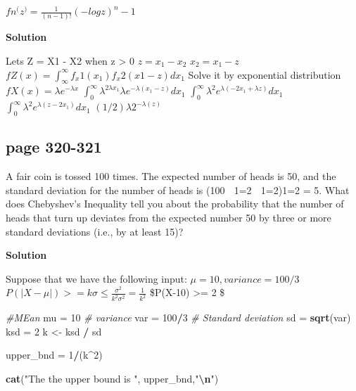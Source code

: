 \documentclass[
]{article}
\newenvironment{Shaded}{\begin{snugshade}}{\end{snugshade}}
\newcommand{\CommentTok}[1]{\textcolor[rgb]{0.56,0.35,0.01}{\textit{#1}}}
\newcommand{\DecValTok}[1]{\textcolor[rgb]{0.00,0.00,0.81}{#1}}
\newcommand{\FunctionTok}[1]{\textcolor[rgb]{0.13,0.29,0.53}{\textbf{#1}}}
\newcommand{\NormalTok}[1]{#1}
\newcommand{\OtherTok}[1]{\textcolor[rgb]{0.56,0.35,0.01}{#1}}
\newcommand{\SpecialCharTok}[1]{\textcolor[rgb]{0.81,0.36,0.00}{\textbf{#1}}}
\newcommand{\StringTok}[1]{\textcolor[rgb]{0.31,0.60,0.02}{#1}}
\begin{document}
\(fn^(z^) = \frac {1}{(n-1)!}(-log z)^n-1\)

\textbf{Solution}

Lets Z = X1 - X2 when z \textgreater{} 0 \(z = x_1 - x_2\)
\(x_2 = x_1 - z\)
\(fZ(x) = \int_{\infty}^\infty f_x1(x_1) f_x2(x1 - z)dx_1\) Solve it by
exponential distribution \(fX(x) = \lambda e ^{-\lambda x}\)
\(\int_{0}^\infty \lambda ^{2\lambda x_1} \lambda e ^{-\lambda (x_1 - z)} dx_1\)
\(\int_{0}^\infty \lambda ^2e^{\lambda( -2x_1 + \lambda z)} dx_1\)
\(\int_{0}^\infty \lambda ^2e^{\lambda (z-2x_1)}dx_1\)
\((1/2)\lambda 2^{-\lambda(z)}\)

\hypertarget{page-320-321}{%
\subsection{page 320-321}\label{page-320-321}}

A fair coin is tossed 100 times. The expected number of heads is 50, and
the standard deviation for the number of heads is (100  1=2  1=2)1=2 =
5. What does Chebyshev's Inequality tell you about the probability that
the number of heads that turn up deviates from the expected number 50 by
three or more standard deviations (i.e., by at least 15)?

\textbf{Solution}

Suppose that we have the following input:
\(\mu = 10 , variance = 100/3\)
\(P(|X-\mu|) >= k\sigma \le \frac {\sigma^2}{k^2\sigma^2} = \frac {1}{k^2}\)
\$P(\textbar X-10\textbar) \textgreater= 2 \le {} \$

\begin{Shaded}
\begin{Highlighting}[]
\CommentTok{\#MEan }
\NormalTok{mu }\OtherTok{=} \DecValTok{10} 
\CommentTok{\# variance}
\NormalTok{var }\OtherTok{=} \DecValTok{100}\SpecialCharTok{/}\DecValTok{3}
\CommentTok{\# Standard deviation }
\NormalTok{sd }\OtherTok{=} \FunctionTok{sqrt}\NormalTok{(var)}
\NormalTok{ksd }\OtherTok{=} \DecValTok{2} 
\NormalTok{k }\OtherTok{\textless{}{-}}\NormalTok{ ksd }\SpecialCharTok{/}\NormalTok{ sd}

\NormalTok{upper\_bnd }\OtherTok{=} \DecValTok{1}\SpecialCharTok{/}\NormalTok{(k}\SpecialCharTok{\^{}}\DecValTok{2}\NormalTok{)}


\FunctionTok{cat}\NormalTok{(}\StringTok{"The the upper bound is "}\NormalTok{, upper\_bnd,}\StringTok{"}\SpecialCharTok{\textbackslash{}n}\StringTok{"}\NormalTok{)}
\end{Highlighting}
\end{Shaded}
\end{document}
